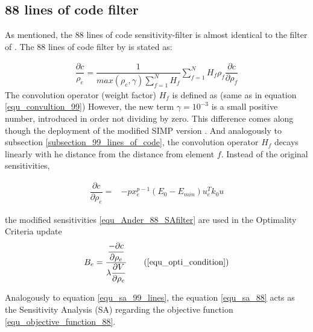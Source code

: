  \subsection{88 lines of code filter} 
 As mentioned, the 88 lines of code sensitivity-filter is almost identical to the filter of \cite{Sigmund.2001}. The 88 lines of code filter by \cite{Andreassen.2011} is stated as:

 \begin{align}
 \dfrac{\partial c} {\rho_e} = \dfrac{1}{\displaystyle max(\rho_e,\gamma)\displaystyle\sum_{f=1}^{N}H_f}\sum_{f=1}^{N} H_f \rho_f \dfrac{\partial c}{\partial \rho_f}
 \label{equ_Ander_88_SAfilter}
 \end{align}
 The convolution operator (weight factor) \textbf{$H_f$} is defined as (same as in equation \ref{equ_convultion_99})
However, the new term \textbf{$\gamma = 10^{-3}$} is a small positive number, introduced in order not dividing by zero. This difference comes along though the deployment of the modified SIMP version \cite{Sigmund.2007}.
And analogously to subsection \ref{subsection_99_lines_of_code}, the convolution operator \textbf{$H_f$} decays linearly with he distance from the distance from element \textbf{$f$}. Instead of the original sensitivities,

\begin{align}
\dfrac{\partial c}{\partial \rho_e} =& -p x_e^{p-1} (E_0-E_{min})u_e^Tk_0u
\label{equ_sa_88}
\end{align}

the modified sensitivities \eqref{equ_Ander_88_SAfilter} are used in the Optimality Criteria update
\begin{align}
B_e = \dfrac{\dfrac{-\partial c}{\partial \rho_e}}{\displaystyle\lambda \dfrac{\partial V}{\partial\rho_e}}
\tag{\ref{equ_opti_condition}}
\end{align}
 
 Analogously to equation \eqref{equ_sa_99_lines}, the equation \ref{equ_sa_88}
  acts as the Sensitivity Analysis (SA) regarding the objective function \eqref{equ_objective_function_88}.
 
	
% 
 
